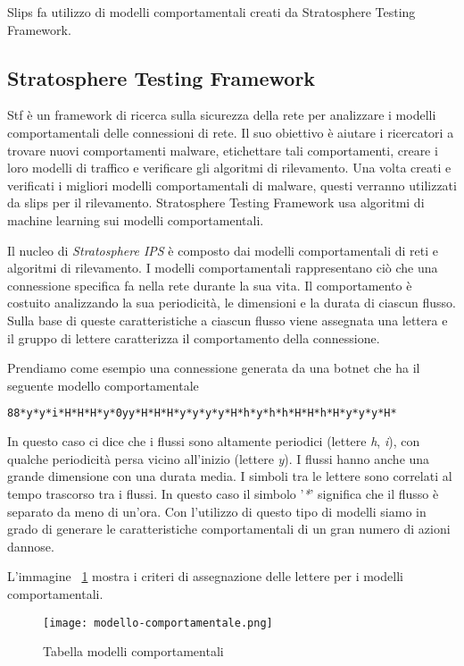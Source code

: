 \documentclass[../main.tex]{subfiles}
\begin{document}
Slips fa utilizzo di modelli comportamentali creati da Stratosphere Testing Framework.

\subsection{Stratosphere Testing Framework}
Stf è un framework di ricerca sulla sicurezza della rete per analizzare i modelli comportamentali delle connessioni di rete. Il suo obiettivo è aiutare i ricercatori a trovare nuovi comportamenti malware, etichettare tali comportamenti, creare i loro modelli di traffico e verificare gli algoritmi di rilevamento. Una volta creati e verificati i migliori modelli comportamentali di malware, questi verranno utilizzati da slips per il rilevamento. Stratosphere Testing Framework usa algoritmi di machine learning sui modelli comportamentali.

Il nucleo di \textit{Stratosphere IPS} è composto dai modelli comportamentali di reti e algoritmi di rilevamento. I modelli comportamentali rappresentano ciò che una connessione specifica fa nella rete durante la sua vita. Il comportamento è costuito analizzando la sua periodicità, le dimensioni e la durata di ciascun flusso. Sulla base di queste caratteristiche a ciascun flusso viene assegnata una lettera e il gruppo di lettere caratterizza il comportamento della connessione.

Prendiamo come esempio una connessione generata da una botnet che ha il seguente modello comportamentale
\begin{lstlisting}[language=bash]
88*y*y*i*H*H*H*y*0yy*H*H*H*y*y*y*y*H*h*y*h*h*H*H*h*H*y*y*y*H*
\end{lstlisting}

In questo caso ci dice che i flussi sono altamente periodici (lettere \textit{h}, \textit{i}), con qualche periodicità persa vicino all'inizio (lettere \textit{y}). I flussi hanno anche una grande dimensione con una durata media. I simboli tra le lettere sono correlati al tempo trascorso tra i flussi. In questo caso il simbolo '\textit{*}' significa che il flusso è separato da meno di un'ora.
Con l'utilizzo di questo tipo di modelli siamo in grado di generare le caratteristiche comportamentali di un gran numero di azioni dannose. 

L'immagine ~\ref{fig:modelliComportamentali} mostra i criteri di assegnazione delle lettere per i modelli comportamentali.

\begin{figure}[H]
\centering
\texttt{[image: modello-comportamentale.png]}
				\caption{Tabella modelli comportamentali}
				\label{fig:modelliComportamentali}
\end{figure}
\end{document}

